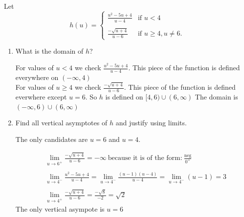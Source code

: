 \documentclass[nooutcomes,handout]{ximera}
\begin{document}
\begin{problem}
Let 
    \[
      h(u) =
      \begin{cases}
        \frac{u^2-5u+4}{u - 4} & \mbox{if $u < 4$}\\ \\
         \frac{-\sqrt{u+4}}{u - 6} & \mbox{if $u \ge 4, u \ne 6$}.
      \end{cases}
    \]

\begin{enumerate}
	\item What is the domain of $h$?

	\begin{freeResponse}
	For values of $u<4$ we check $\frac{u^2-5u+4}{u - 4}$.  This piece of the function is defined everywhere on $(-\infty,4)$\\
	For values of $u\geq 4$ we check $\frac{-\sqrt{u+4}}{u - 6}$. This piece of the function is defined everwhere except $u=6$.  So $h$ is defined on $[4,6)\cup(6,\infty)$
	The domain is $(-\infty,6)\cup(6,\infty)$
	\end{freeResponse}

	\item Find all vertical asymptotes of $h$ and justify using limits.

	\begin{freeResponse}
	The only candidates are $u=6$ and $u=4$.
	
	\begin{align*}
	&\lim_{u \to 6^+}\frac{-\sqrt{u+4}}{u - 6}=-\infty\ \text{because it is of the form:}\ \frac{\text{neg}}{0^+}\\ \\
	&\lim_{u \to 4^-} \frac{u^2-5u+4}{u - 4}=\lim_{u \to 4^-} \frac{(u-1)(u-4)}{u - 4}=\lim_{u \to 4^-} (u-1)=3 \\ \\
	&\lim_{u \to 4^+} \frac{-\sqrt{u+4}}{u - 6}=\frac{-\sqrt{8}}{-2}=\sqrt{2}
	\end{align*}
	The only vertical asympote is $u=6$
	\end{freeResponse}
	

\end{enumerate}
\end{problem}
\end{document}
